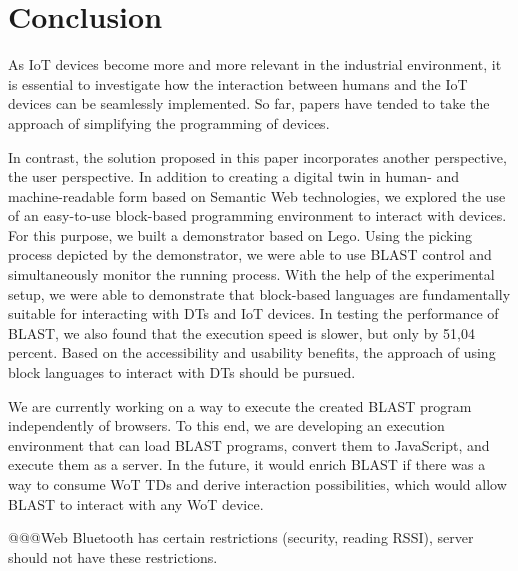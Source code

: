 \documentclass[runningheads]{llncs}
\begin{document}
\section{Conclusion}
As IoT devices become more and more relevant in the industrial environment, it is essential to investigate how the interaction between humans and the IoT devices can be seamlessly implemented.
So far, papers have tended to take the approach of simplifying the programming of devices.

In contrast, the solution proposed in this paper incorporates another perspective, the user perspective.
In addition to creating a digital twin in human- and machine-readable form based on Semantic Web technologies, we explored the use of an easy-to-use block-based programming environment to interact with devices.
For this purpose, we built a demonstrator based on Lego. Using the picking process depicted by the demonstrator, we were able to use BLAST control and simultaneously monitor the running process.
With the help of the experimental setup, we were able to demonstrate that block-based languages are fundamentally suitable for interacting with DTs and IoT devices.
In testing the performance of BLAST, we also found that the execution speed is slower, but only by 51,04 percent.
Based on the accessibility and usability benefits, the approach of using block languages to interact with DTs should be pursued.

We are currently working on a way to execute the created BLAST program independently of browsers.
To this end, we are developing an execution environment that can load BLAST programs, convert them to JavaScript, and execute them as a server.
In the future, it would enrich BLAST if there was a way to consume WoT TDs and derive interaction possibilities, which would allow BLAST to interact with any WoT device.

@@@Web Bluetooth has certain restrictions (security, reading RSSI), server should not have these restrictions.

%
%
%


%
\end{document}
